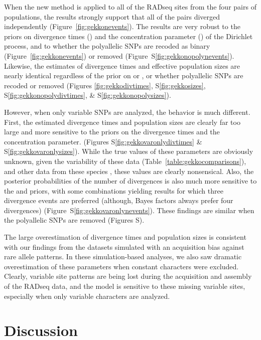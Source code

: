 When the new method is applied to all of the RADseq sites from the
four pairs of  populations, the results strongly
support that all of the pairs diverged independently
(Figure~\ref{fig:gekkonevents}).
The results are very robust to the priors on divergence times (\divtime)
and the concentration parameter (\concentration) of the Dirichlet process, and
to whether the polyallelic SNPs are recoded as binary
(Figure~\ref{fig:gekkonevents})
or removed
(Figure~S\ref{fig:gekkonopolynevents}).
Likewise, the estimates of divergence times and effective population sizes
are nearly identical regardless of the prior on \divtime or \concentration,
or whether polyallelic SNPs are recoded or removed
(Figures
\ref{fig:gekkodivtimes},
S\ref{fig:gekkosizes},
S\ref{fig:gekkonopolydivtimes},
\&
S\ref{fig:gekkonopolysizes}).

However, when only variable SNPs are analyzed, the behavior is much different.
First, the estimated divergence times and population sizes are clearly far too
large and more sensitive to the priors on the divergence times and the
concentration parameter.
(Figures
S\ref{fig:gekkovaronlydivtimes}
\&
S\ref{fig:gekkovaronlysizes}).
While the true values of these parameters are obviously unknown, given the
variability of these data (Table~\ref{table:gekkocomparisons}), and other data
from these species \citep{Siler2012, Siler2014kikuchii}, these values are
clearly nonsensical.
Also, the posterior probabilities of the number of divergences is also
much more sensitive to the \divtime and \concentration priors,
with some combinations yielding results for which three divergence events
are preferred (although, Bayes factors always prefer four divergences)
(Figure~S\ref{fig:gekkovaronlynevents}).
These findings are similar when the polyallelic SNPs are removed
(Figures
S).

The large overestimation of divergence times and population sizes is consistent
with our findings from the datasets simulated with an acquisition bias against
rare allele patterns.
In these simulation-based analyses, we also saw dramatic overestimation of
these parameters when constant characters were excluded.
Clearly, variable site patterns are being lost during the acquisition and
assembly of the RADseq data, and the model is sensitive to these missing
variable sites, especially when only variable characters are analyzed.


\section{Discussion}


